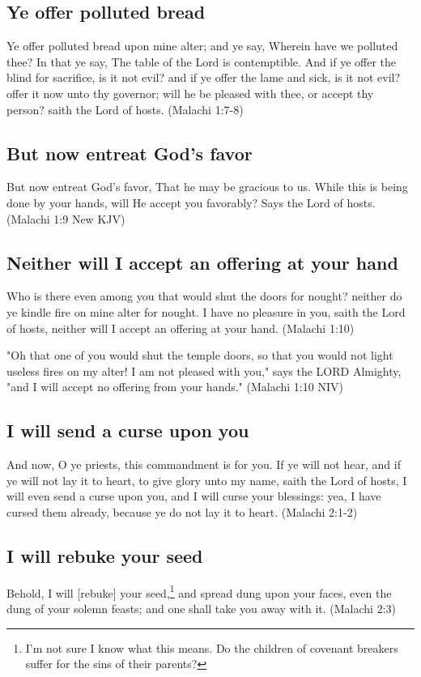 \subsection{Ye offer polluted bread}
Ye offer polluted bread upon mine alter; and ye say, Wherein have we polluted thee? In that ye say, The table of the Lord is contemptible. And if ye offer the blind for sacrifice, is it not evil? and if ye offer the lame and sick, is it not evil? offer it now unto thy governor; will he be pleased with thee, or accept thy person? saith the Lord of hosts. (Malachi 1:7-8)

\subsection{But now entreat God's favor}
But now entreat God's favor, That he may be gracious to us. While this is being done by your hands, will He accept you favorably? Says the Lord of hosts. (Malachi 1:9 New KJV)

\subsection{Neither will I accept an offering at your hand}
Who is there even among you that would shut the doors for nought? neither do ye kindle fire on mine alter for nought. I have no pleasure in you, saith the Lord of hosts, neither will I accept an offering at your hand. (Malachi 1:10)

"Oh that one of you would shut the temple doors, so that you would not light useless fires on my alter! I am not pleased with you," says the LORD Almighty, "and I will accept no offering from your hands." (Malachi 1:10 NIV)

\subsection{I will send a curse upon you}
And now, O ye priests, this commandment is for you. If ye will not hear, and if ye will not lay it to heart, to give glory unto my name, saith the Lord of hosts, I will even send a curse upon you, and I will curse your blessings: yea, I have cursed them already, because ye do not lay it to heart. (Malachi 2:1-2)

\subsection{I will rebuke your seed}
Behold, I will [rebuke] your seed,\footnote{I'm not sure I know what this means. Do the children of covenant breakers suffer for the sins of their parents?} and spread dung upon your faces, even the dung of your solemn feasts; and one shall take you away with it. (Malachi 2:3)

